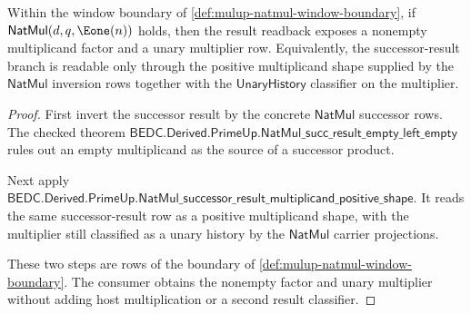 \begin{theorem}
\label{thm:mulup-successor-product-factor-readback}
Within the window boundary of
\autoref{def:mulup-natmul-window-boundary}, if
$\mathsf{NatMul}(d,q,\Eone(n))$ holds, then the result readback exposes a
nonempty multiplicand factor and a unary multiplier row. Equivalently,
the successor-result branch is readable only through the positive
multiplicand shape supplied by the $\mathsf{NatMul}$ inversion rows
together with the $\mathsf{UnaryHistory}$ classifier on the multiplier.
\end{theorem}
\begin{proof}
First invert the successor result by the concrete
$\mathsf{NatMul}$ successor rows. The checked theorem
$\mathsf{BEDC.Derived.PrimeUp.NatMul\_succ\_result\_empty\_left\_empty}$
rules out an empty multiplicand as the source of a successor product.

Next apply
$\mathsf{BEDC.Derived.PrimeUp.NatMul\_successor\_result\_multiplicand\_positive\_shape}$.
It reads the same successor-result row as a positive multiplicand shape,
with the multiplier still classified as a unary history by the
$\mathsf{NatMul}$ carrier projections.

These two steps are rows of the boundary of
\autoref{def:mulup-natmul-window-boundary}. The consumer obtains the
nonempty factor and unary multiplier without adding host multiplication
or a second result classifier.
\end{proof}

